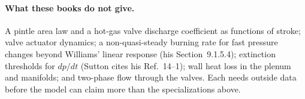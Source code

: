 \paragraph{What these books do not give.} A pintle area law and a
hot-gas valve discharge coefficient as functions of stroke; valve
actuator dynamics; a non-quasi-steady burning rate for fast pressure
changes beyond Williams' linear response (his Section~9.1.5.4);
extinction thresholds for $dp/dt$ (Sutton cites his Ref.~14--1); wall
heat loss in the plenum and manifolds; and two-phase flow through the
valves. Each needs outside data before the model can claim more than
the specializations above.
